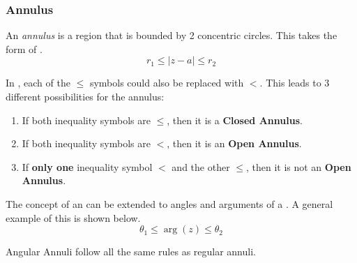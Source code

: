 \subsubsection{Annulus}\label{subsubsec:Annulus}
\begin{definition}[Annulus]\label{def:Annulus}
  An \emph{annulus} is a region that is bounded by 2 concentric circles.
  This takes the form of .
  \begin{equation}\label{eq:Annulus}
    r_{1} \leq \lvert z - a \rvert \leq r_{2}
  \end{equation}

  In , each of the $\leq$ symbols could also be replaced with $<$.
  This leads to 3 different possibilities for the annulus:
  \begin{enumerate}[noitemsep]
  \item If both inequality symbols are $\leq$, then it is a \textbf{Closed Annulus}.
  \item If both inequality symbols are $<$, then it is an \textbf{Open Annulus}.
  \item If \textbf{only one} inequality symbol $<$ and the other $\leq$, then it is not an \textbf{Open Annulus}.
  \end{enumerate}
\end{definition}

The concept of an  can be extended to angles and arguments of a .
A general example of this is shown below.
\begin{equation*}
  \theta_{1} \leq \arg(z) \leq \theta_{2}
\end{equation*}

Angular Annuli follow all the same rules as regular annuli.

